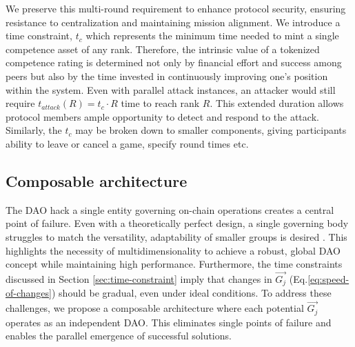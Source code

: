 \documentclass{article}
\begin{document}
\begin{CJK}{UTF8}{gbsn}
\begin{multicols}{2}
            We preserve this multi-round requirement to enhance protocol security, ensuring resistance to centralization and maintaining mission alignment. We introduce a time constraint,  $t_c$ which represents the minimum time needed to mint a single competence asset of any rank.
            Therefore, the intrinsic value of a tokenized competence rating is determined not only by financial effort and success among peers but also by the time invested in continuously improving one's position within the system. Even with parallel attack instances, an attacker would still require $t_{attack}(R) = t_c \cdot R$ time to reach rank $R$. This extended duration allows protocol members ample opportunity to detect and respond to the attack. Similarly, the $t_c$ may be broken down to smaller components, giving participants ability to leave or cancel a game, specify round times etc.


            \subsection{Composable architecture}
            The DAO hack\cite{Liu2021} a single entity governing on-chain operations creates a central point of failure. Even with a theoretically perfect design, a single governing body struggles to match the versatility, adaptability of smaller groups is desired \cite{Buterin22}.  This highlights the necessity of multidimensionality to achieve a robust, global DAO concept while maintaining high performance.
            Furthermore, the time constraints discussed in Section \ref{sec:time-constraint} imply that changes in ${\vec{G_j}}$ (Eq.\ref{eq:speed-of-changes}) should be gradual, even under ideal conditions.
            To address these challenges, we propose a composable architecture where each potential ${\vec{G_j}}$ operates as an independent DAO. This eliminates single points of failure and enables the parallel emergence of successful solutions.


\end{multicols}
\end{CJK}
\end{document}
